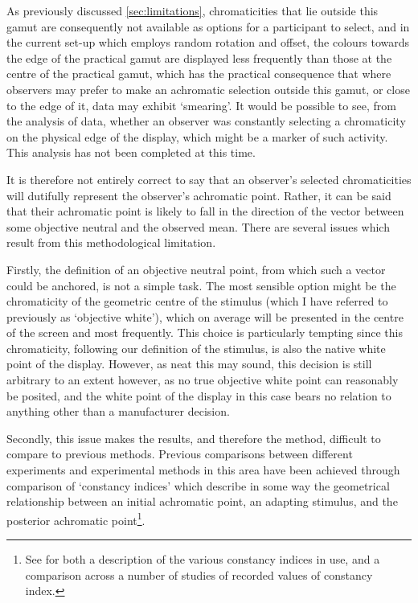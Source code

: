 As previously discussed \ref{sec:limitations}, chromaticities that lie outside this gamut are consequently not available as options for a participant to select, and in the current set-up which employs random rotation and offset, the colours towards the edge of the practical gamut are displayed less frequently than those at the centre of the practical gamut, which has the practical consequence that where observers may prefer to make an achromatic selection outside this gamut, or close to the edge of it, data may exhibit `smearing'. It would be possible to see, from the analysis of data, whether an observer was constantly selecting a chromaticity on the physical edge of the display, which might be a marker of such activity. This analysis has not been completed at this time.

It is therefore not entirely correct to say that an observer's selected chromaticities will dutifully represent the observer's achromatic point. Rather, it can be said that their achromatic point is likely to fall in the direction of the vector between some objective neutral and the observed mean. There are several issues which result from this methodological limitation.

Firstly, the definition of an objective neutral point, from which such a vector could be anchored, is not a simple task. The most sensible option might be the chromaticity of the geometric centre of the stimulus (which I have referred to previously as `objective white'), which on average will be presented in the centre of the screen and most frequently. This choice is particularly tempting since this chromaticity, following our definition of the stimulus, is also the native white point of the display. However, as neat this may sound, this decision is still arbitrary to an extent however, as no true objective white point can reasonably be posited, and the white point of the display in this case bears no relation to anything other than a manufacturer decision. 

Secondly, this issue makes the results, and therefore the method, difficult to compare to previous methods. Previous comparisons between different experiments and experimental methods in this area have been achieved through comparison of `constancy indices' which describe in some way the geometrical relationship between an initial achromatic point, an adapting stimulus, and the posterior achromatic point\footnote{See \citet{foster_color_2011} for both a description of the various constancy indices in use, and a comparison across a number of studies of recorded values of constancy index.}. 

